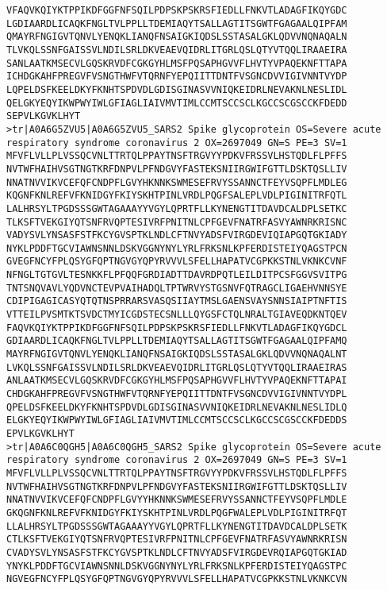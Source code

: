 \documentclass[en,black,12pt,normal]{elegantnote}
\begin{document}
\begin{lstlisting}
VFAQVKQIYKTPPIKDFGGFNFSQILPDPSKPSKRSFIEDLLFNKVTLADAGFIKQYGDC
LGDIAARDLICAQKFNGLTVLPPLLTDEMIAQYTSALLAGTITSGWTFGAGAALQIPFAM
QMAYRFNGIGVTQNVLYENQKLIANQFNSAIGKIQDSLSSTASALGKLQDVVNQNAQALN
TLVKQLSSNFGAISSVLNDILSRLDKVEAEVQIDRLITGRLQSLQTYVTQQLIRAAEIRA
SANLAATKMSECVLGQSKRVDFCGKGYHLMSFPQSAPHGVVFLHVTYVPAQEKNFTTAPA
ICHDGKAHFPREGVFVSNGTHWFVTQRNFYEPQIITTDNTFVSGNCDVVIGIVNNTVYDP
LQPELDSFKEELDKYFKNHTSPDVDLGDISGINASVVNIQKEIDRLNEVAKNLNESLIDL
QELGKYEQYIKWPWYIWLGFIAGLIAIVMVTIMLCCMTSCCSCLKGCCSCGSCCKFDEDD
SEPVLKGVKLHYT
>tr|A0A6G5ZVU5|A0A6G5ZVU5_SARS2 Spike glycoprotein OS=Severe acute respiratory syndrome coronavirus 2 OX=2697049 GN=S PE=3 SV=1
MFVFLVLLPLVSSQCVNLTTRTQLPPAYTNSFTRGVYYPDKVFRSSVLHSTQDLFLPFFS
NVTWFHAIHVSGTNGTKRFDNPVLPFNDGVYFASTEKSNIIRGWIFGTTLDSKTQSLLIV
NNATNVVIKVCEFQFCNDPFLGVYHKNNKSWMESEFRVYSSANNCTFEYVSQPFLMDLEG
KQGNFKNLREFVFKNIDGYFKIYSKHTPINLVRDLPQGFSALEPLVDLPIGINITRFQTL
LALHRSYLTPGDSSSGWTAGAAAYYVGYLQPRTFLLKYNENGTITDAVDCALDPLSETKC
TLKSFTVEKGIYQTSNFRVQPTESIVRFPNITNLCPFGEVFNATRFASVYAWNRKRISNC
VADYSVLYNSASFSTFKCYGVSPTKLNDLCFTNVYADSFVIRGDEVIQIAPGQTGKIADY
NYKLPDDFTGCVIAWNSNNLDSKVGGNYNYLYRLFRKSNLKPFERDISTEIYQAGSTPCN
GVEGFNCYFPLQSYGFQPTNGVGYQPYRVVVLSFELLHAPATVCGPKKSTNLVKNKCVNF
NFNGLTGTGVLTESNKKFLPFQQFGRDIADTTDAVRDPQTLEILDITPCSFGGVSVITPG
TNTSNQVAVLYQDVNCTEVPVAIHADQLTPTWRVYSTGSNVFQTRAGCLIGAEHVNNSYE
CDIPIGAGICASYQTQTNSPRRARSVASQSIIAYTMSLGAENSVAYSNNSIAIPTNFTIS
VTTEILPVSMTKTSVDCTMYICGDSTECSNLLLQYGSFCTQLNRALTGIAVEQDKNTQEV
FAQVKQIYKTPPIKDFGGFNFSQILPDPSKPSKRSFIEDLLFNKVTLADAGFIKQYGDCL
GDIAARDLICAQKFNGLTVLPPLLTDEMIAQYTSALLAGTITSGWTFGAGAALQIPFAMQ
MAYRFNGIGVTQNVLYENQKLIANQFNSAIGKIQDSLSSTASALGKLQDVVNQNAQALNT
LVKQLSSNFGAISSVLNDILSRLDKVEAEVQIDRLITGRLQSLQTYVTQQLIRAAEIRAS
ANLAATKMSECVLGQSKRVDFCGKGYHLMSFPQSAPHGVVFLHVTYVPAQEKNFTTAPAI
CHDGKAHFPREGVFVSNGTHWFVTQRNFYEPQIITTDNTFVSGNCDVVIGIVNNTVYDPL
QPELDSFKEELDKYFKNHTSPDVDLGDISGINASVVNIQKEIDRLNEVAKNLNESLIDLQ
ELGKYEQYIKWPWYIWLGFIAGLIAIVMVTIMLCCMTSCCSCLKGCCSCGSCCKFDEDDS
EPVLKGVKLHYT
>tr|A0A6C0QGH5|A0A6C0QGH5_SARS2 Spike glycoprotein OS=Severe acute respiratory syndrome coronavirus 2 OX=2697049 GN=S PE=3 SV=1
MFVFLVLLPLVSSQCVNLTTRTQLPPAYTNSFTRGVYYPDKVFRSSVLHSTQDLFLPFFS
NVTWFHAIHVSGTNGTKRFDNPVLPFNDGVYFASTEKSNIIRGWIFGTTLDSKTQSLLIV
NNATNVVIKVCEFQFCNDPFLGVYYHKNNKSWMESEFRVYSSANNCTFEYVSQPFLMDLE
GKQGNFKNLREFVFKNIDGYFKIYSKHTPINLVRDLPQGFWALEPLVDLPIGINITRFQT
LLALHRSYLTPGDSSSGWTAGAAAYYVGYLQPRTFLLKYNENGTITDAVDCALDPLSETK
CTLKSFTVEKGIYQTSNFRVQPTESIVRFPNITNLCPFGEVFNATRFASVYAWNRKRISN
CVADYSVLYNSASFSTFKCYGVSPTKLNDLCFTNVYADSFVIRGDEVRQIAPGQTGKIAD
YNYKLPDDFTGCVIAWNSNNLDSKVGGNYNYLYRLFRKSNLKPFERDISTEIYQAGSTPC
NGVEGFNCYFPLQSYGFQPTNGVGYQPYRVVVLSFELLHAPATVCGPKKSTNLVKNKCVN

\end{lstlisting}
\end{document}
